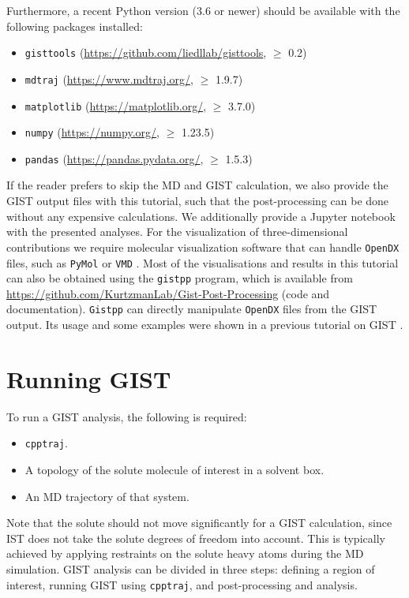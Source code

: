 \documentclass[9pt,tutorial]{livecoms}
\newcommand{\software}{\texttt}
\begin{document}
Furthermore, a recent Python version (3.6 or newer) should be available with the following packages installed:
\begin{itemize}
	\item \software{gisttools} (\url{https://github.com/liedllab/gisttools}, $\geq$ 0.2)
	\item \software{mdtraj} (\url{https://www.mdtraj.org/}, $\geq$ 1.9.7) \cite{McGibbon2015-mdtraj}
	\item \software{matplotlib} (\url{https://matplotlib.org/}, $\geq$ 3.7.0) \cite{Hunter2007-matplotlib}
	\item \software{numpy} (\url{https://numpy.org/}, $\geq$ 1.23.5) \cite{harris2020-numpy}
	\item \software{pandas} (\url{https://pandas.pydata.org/}, $\geq$ 1.5.3) \cite{pandas-2023_8239932}
\end{itemize}
If the reader prefers to skip the MD and GIST calculation, we also provide the GIST output files with this tutorial, such that the post-processing can be done without any expensive calculations.
We additionally provide a Jupyter notebook \cite{Kluyver2016-jupyter,Granger2021-jupyter} with the presented analyses. 
For the visualization of three-dimensional contributions we require molecular visualization software that can handle \software{OpenDX} files, such as \software{PyMol} \cite{pymol} or \software{VMD} \cite{vmd}.
Most of the visualisations and results in this tutorial can also be obtained using the \software{gistpp} program, which is available from \url{https://github.com/KurtzmanLab/Gist-Post-Processing} (code and documentation). \software{Gistpp} can directly manipulate \software{OpenDX} files from the GIST output. 
Its usage and some examples were shown in a previous tutorial on GIST \cite{Ramsey2016}.

\pagebreak %

\section{Running GIST}
\label{sec:running_GIST}
To run a GIST analysis, the following is required:
\begin{itemize}
	\item \software{cpptraj}.
	\item A topology of the solute molecule of interest in a solvent box.
	\item An MD trajectory of that system.
\end{itemize}
Note that the solute should not move significantly for a GIST calculation, since IST does not take the solute degrees of freedom into account.
This is typically achieved by applying restraints on the solute heavy atoms during the MD simulation.
GIST analysis can be divided in three steps: defining a region of interest, running GIST using \software{cpptraj}, and post-processing and analysis.
\cite{Ramsey2016}
\end{document}
